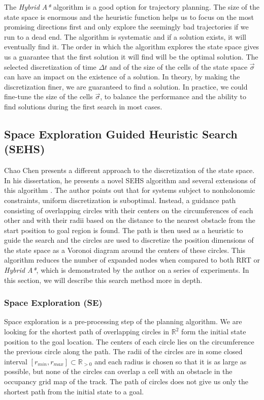 The \textit{Hybrid A*} algorithm is a good option for trajectory planning. The size of the state space is enormous and the heuristic function helps us to focus on the most promising directions first and only explore the seemingly bad trajectories if we run to a dead end. The algorithm is systematic and if a solution exists, it will eventually find it. The order in which the algorithm explores the state space gives us a guarantee that the first solution it will find will be the optimal solution. The selected discretization of time $\Delta t$ and of the size of the cells of the state space $\vec{\sigma}$ can have an impact on the existence of a solution. In theory, by making the discretization finer, we are guaranteed to find a solution. In practice, we could fine-tune the size of the cells $\vec{\sigma}$, to balance the performance and the ability to find solutions during the first search in most cases.

\subsection{Space Exploration Guided Heuristic Search (SEHS)}

Chao Chen presents a different approach to the discretization of the state space. In his dissertation, he presents a novel \gls{SEHS} algorithm and several extensions of this algorithm \cite{SEHS}. The author points out that for systems subject to nonholonomic constraints, uniform discretization is suboptimal. Instead, a guidance path consisting of overlapping circles with their centers on the circumferences of each other and with their radii based on the distance to the nearest obstacle from the start position to goal region is found. The path is then used as a heuristic to guide the search and the circles are used to discretize the position dimensions of the state space as a Voronoi diagram around the centers of these circles. This algorithm reduces the number of expanded nodes when compared to both \gls*{RRT} or \textit{Hybrid A*}, which is demonstrated by the author on a series of experiments. In this section, we will describe this search method more in depth.

\subsubsection{Space Exploration (SE)}
\label{sec:space_exploration}

Space exploration is a pre-processing step of the planning algorithm. We are looking for the shortest path of overlapping circles in $\mathbb{R}^2$ form the initial state position to the goal location. The centers of each circle lies on the circumference the previous circle along the path. The radii of the circles are in some closed interval $\left[r_{min}, r_{max}\right]\subset \mathbb{R}_{>0}$ and each radius is chosen so that it is as large as possible, but none of the circles can overlap a cell with an obstacle in the occupancy grid map of the track. The path of circles does not give us only the shortest path from the initial state to a goal.

